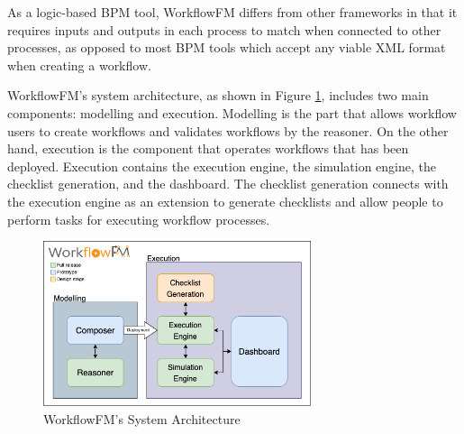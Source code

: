As a logic-based BPM tool, WorkflowFM differs from other frameworks in that it requires inputs and outputs in each process to match when connected to other processes, as opposed to most BPM tools which accept any viable XML format when creating a workflow.

WorkflowFM's system architecture, as shown in Figure \ref{fig:workflowfm-system}, includes two main components: modelling and execution. Modelling is the part that allows workflow users to create workflows and validates workflows by the reasoner. On the other hand, execution is the component that operates workflows that has been deployed. Execution contains the execution engine, the simulation engine, the checklist generation, and the dashboard. The checklist generation connects with the execution engine as an extension to generate checklists and allow people to perform tasks for executing workflow processes.

\begin{figure}
    \centering
    \includegraphics[width=0.7\textwidth]{overleaf/images/workflowfm-system.png}
    \caption{WorkflowFM's System Architecture}
    \label{fig:workflowfm-system}
\end{figure}

